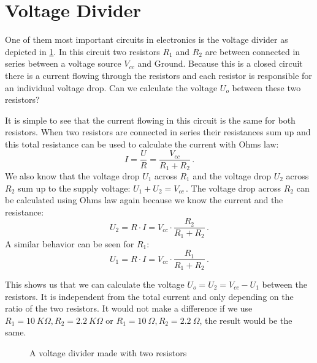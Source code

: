 \section{Voltage Divider}

One of them most important circuits in electronics is the voltage divider as depicted in \cref{fig:simple-voltage-divider}. In this circuit two resistors $R_1$ and $R_2$ are between connected in series between a voltage source $V_{cc}$ and Ground. Because this is a closed circuit there is a current flowing through the resistors and each resistor is responsible for an individual voltage drop. Can we calculate the voltage $U_o$ between these two resistors?

It is simple to see that the current flowing in this circuit is the same for both resistors. When two resistors are connected in series their resistances sum up and this total resistance can be used to calculate the current with Ohms law:
\begin{equation*}
	I = \frac{U}{R} = \frac{V_{cc}}{R_1 + R_2}\,.
\end{equation*}
We also know that the voltage drop $U_1$ across $R_1$ and the voltage drop $U_2$ across $R_2$ sum up to the supply voltage: $U_1 + U_2 = V_{cc}\,$. The voltage drop across $R_2$ can be calculated using Ohms law again because we know the current and the resistance:
\begin{equation}
	U_2 = R \cdot I = V_{cc} \cdot \frac{R_2}{R_1 + R_2}\,.
\end{equation}
A similar behavior can be seen for $R_1$:
\begin{equation}
	U_1 = R \cdot I = V_{cc} \cdot \frac{R_1}{R_1 + R_2}\,.
\end{equation}

This shows us that we can calculate the voltage $U_o = U_2 = V_{cc} - U_1$ between the resistors. It is independent from the total current and only depending on the ratio of the two resistors. It would not make a difference if we use $R_1 = \SI{10}{K\Omega}, R_2 = \SI{2,2}{K\Omega}$ or $R_1 = \SI{10}{\Omega}, R_2 = \SI{2,2}{\Omega}$, the result would be the same.


\begin{figure}[htb]
	\centering
	\caption{A voltage divider made with two resistors}
	\label{fig:simple-voltage-divider}
\end{figure}


